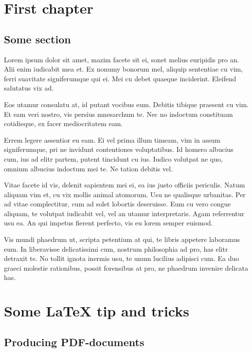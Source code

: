 \documentclass[a4paper,11pt,oneside]{report}
\begin{document}
\pagebreak


\tableofcontents

\pagebreak

\pagestyle{fancy}
\setcounter{page}{1}

\chapter{First chapter}

\section{Some section}

Lorem ipsum dolor sit amet, mazim facete sit ei, sonet melius euripidis pro
an. Alii enim iudicabit mea et. Ex nonumy bonorum mel, aliquip sententiae cu
vim, ferri suavitate signiferumque qui ei. Mei cu debet quaeque
inciderint. Eleifend salutatus vix ad.

Eos utamur consulatu at, id putant vocibus eum. Debitis tibique praesent cu
vim. Et eam veri nostro, vis persius mnesarchum te. Nec no indoctum constituam
cotidieque, ex facer mediocritatem eam.

Errem legere assentior eu eam. Ei vel prima illum timeam, vim in assum
signiferumque, pri ne invidunt contentiones voluptatibus. Id homero albucius
cum, ius ad elitr partem, putent tincidunt cu ius. Iudico volutpat ne quo,
omnium albucius indoctum mei te. Ne tation debitis vel.

Vitae facete id vis, delenit sapientem mei ei, ea ius justo officiis
periculis. Natum aliquam vim et, cu vix mollis animal atomorum. Usu ne qualisque
urbanitas. Per ad vitae complectitur, cum ad solet lobortis deseruisse. Eum cu
vero congue aliquam, te volutpat iudicabit vel, vel an utamur
interpretaris. Agam referrentur usu ea. An qui impetus fierent perfecto, vis eu
lorem semper euismod.

Vis mundi phaedrum ut, scripta petentium at qui, te libris appetere laboramus
eum. In liberavisse delicatissimi cum, nostrum philosophia ad pro, has elitr
detraxit te. No tollit ignota inermis usu, te unum lucilius adipisci cum. Ea duo
graeci molestie rationibus, possit forensibus at pro, ne phaedrum invenire
delicata has.


\chapter{Some {\LaTeX} tip and tricks}

\section{Producing PDF-documents}
\end{document}
